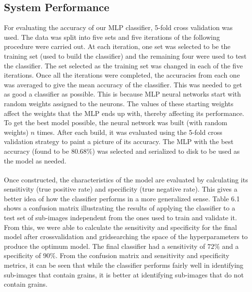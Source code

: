 \bigskip

\goodbreak

\subsection{System Performance}
For evaluating the accuracy of our MLP classifier, 5-fold cross validation was used. The data was split into five sets and five iterations of the following procedure were carried out. At each iteration, one set was selected to be the training set (used to build the classifier) and the remaining four were used to test the classifier. The set selected as the training set was changed in each of the five iterations. Once all the iterations were completed, the accuracies from each one was averaged to give the mean accuracy of the classifier. This was needed to get as good a classifier as possible. This is because MLP neural networks start with random weights assigned to the neurons. The values of these starting weights affect the weights that the MLP ends up with, thereby affecting its performance. To get the best model possible, the neural network was built (with random weights) $n$ times. After each build, it was evaluated using the 5-fold cross validation strategy to paint a picture of its accuracy. The MLP with the best accuracy (found to be $80.68\%$) was selected and serialized to disk to be used as the model as needed.\\ \\
%
Once constructed, the characteristics of the model are evaluated by calculating its sensitivity (true positive rate) and specificity (true negative rate). This gives a better idea of how the classifier performs in a more generalized sense. Table 6.1 shows a confusion matrix illustrating the results of applying the classifier to a test set of sub-images independent from the ones used to train and validate it. From this, we were able to calculate the sensitivity and specificity for the final model after crossvalidation and gridsearching the space of the hyperparameters to produce the optimum model. The final classifier had a sensitivity of $72\%$ and a specificity of $90\%$. From the confusion matrix and sensitivity and specificity metrics, it can be seen that while the classifier performs fairly well in identifying sub-images that contain grains, it is better at identifying sub-images that do not contain grains.     
